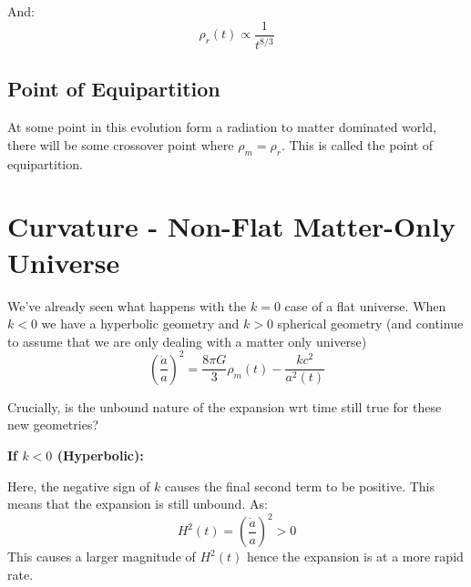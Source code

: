And:
\[
    \rho_r(t) \propto \frac{1}{t^{8/3}}
\]

\subsection{Point of Equipartition}
At some point in this evolution form a radiation to matter dominated world, there will be some crossover point where $\rho_m = \rho_r$. This is called the point of equipartition.

\section{Curvature - Non-Flat Matter-Only Universe}
We've already seen what happens with the $k=0$ case of a flat universe. When $k<0$ we have a hyperbolic geometry and $k>0$ spherical geometry (and continue to assume that we are only dealing with a matter only universe)
\[
    \left(\frac{\dot{a}}{a}\right)^2 = \frac{8 \pi G}{3} \rho_m(t) - \frac{kc^2}{a^2(t)}
\]

Crucially, is the unbound nature of the expansion wrt time still true for these new geometries?

\textbf{If $k<0$ (Hyperbolic):}

Here, the negative sign of $k$ causes the final second term to be positive. This means that the expansion is still unbound. As:
\[
    H^2(t) = \left(\frac{\dot{a}}{a}\right)^2 > 0
\]
This causes a larger magnitude of $H^2(t)$ hence the expansion is at a more rapid rate.